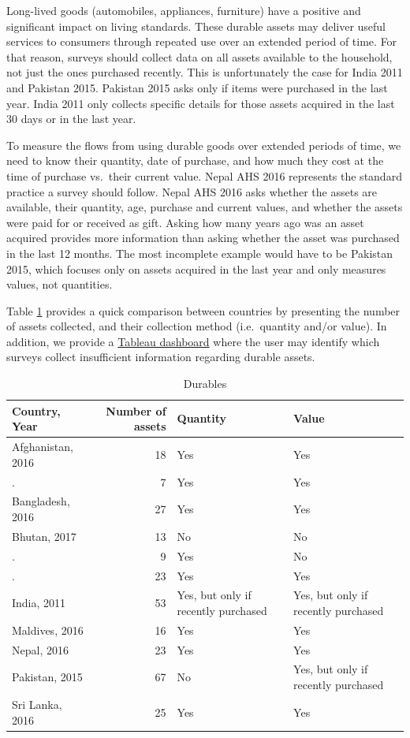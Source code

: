 \documentclass[13 pt,]{book}
\begin{document}
Long-lived goods (automobiles, appliances, furniture) have a positive
and significant impact on living standards. These durable assets may
deliver useful services to consumers through repeated use over an
extended period of time. For that reason, surveys should collect data on
all assets available to the household, not just the ones purchased
recently. This is unfortunately the case for India 2011 and Pakistan
2015. Pakistan 2015 asks only if items were purchased in the last year.
India 2011 only collects specific details for those assets acquired in
the last 30 days or in the last year.

To measure the flows from using durable goods over extended periods of
time, we need to know their quantity, date of purchase, and how much
they cost at the time of purchase vs.~their current value. Nepal AHS
2016 represents the standard practice a survey should follow. Nepal AHS
2016 asks whether the assets are available, their quantity, age,
purchase and current values, and whether the assets were paid for or
received as gift. Asking how many years ago was an asset acquired
provides more information than asking whether the asset was purchased in
the last 12 months. The most incomplete example would have to be
Pakistan 2015, which focuses only on assets acquired in the last year
and only measures values, not quantities.

Table \ref{tab:durables} provides a quick comparison between countries
by presenting the number of assets collected, and their collection
method (i.e.~quantity and/or value). In addition, we provide a
\href{https://tab.worldbank.org/\#/site/WBG/views/SAR_MNA_Metadata/Durables}{Tableau
dashboard} where the user may identify which surveys collect
insufficient information regarding durable assets.

\begin{table}[t]

\caption{\label{tab:durables}Durables}
\centering
\begin{tabular}{lrll}
\toprule
Country, Year & Number of assets & Quantity & Value\\
\midrule
Afghanistan, 2016 & 18 & Yes & Yes\\
. & 7 & Yes & Yes\\
Bangladesh, 2016 & 27 & Yes & Yes\\
Bhutan, 2017 & 13 & No & No\\
. & 9 & Yes & No\\
\addlinespace
. & 23 & Yes & Yes\\
India, 2011 & 53 & Yes, but only if recently purchased & Yes, but only if recently purchased\\
Maldives, 2016 & 16 & Yes & Yes\\
Nepal, 2016 & 23 & Yes & Yes\\
Pakistan, 2015 & 67 & No & Yes, but only if recently purchased\\
\addlinespace
Sri Lanka, 2016 & 25 & Yes & Yes\\
\bottomrule
\end{tabular}
\end{table}
\end{document}

